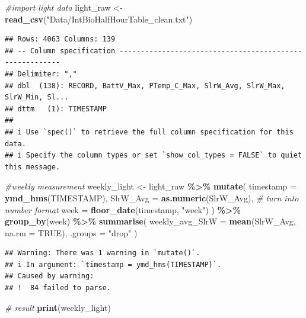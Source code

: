 \documentclass[
]{article}
\newenvironment{Shaded}{\begin{snugshade}}{\end{snugshade}}
\newcommand{\AttributeTok}[1]{\textcolor[rgb]{0.13,0.29,0.53}{#1}}
\newcommand{\CommentTok}[1]{\textcolor[rgb]{0.56,0.35,0.01}{\textit{#1}}}
\newcommand{\ConstantTok}[1]{\textcolor[rgb]{0.56,0.35,0.01}{#1}}
\newcommand{\FunctionTok}[1]{\textcolor[rgb]{0.13,0.29,0.53}{\textbf{#1}}}
\newcommand{\NormalTok}[1]{#1}
\newcommand{\OtherTok}[1]{\textcolor[rgb]{0.56,0.35,0.01}{#1}}
\newcommand{\SpecialCharTok}[1]{\textcolor[rgb]{0.81,0.36,0.00}{\textbf{#1}}}
\newcommand{\StringTok}[1]{\textcolor[rgb]{0.31,0.60,0.02}{#1}}
\begin{document}
\begin{Shaded}
\begin{Highlighting}[]
\CommentTok{\#import light data}
\NormalTok{light\_raw }\OtherTok{\textless{}{-}} \FunctionTok{read\_csv}\NormalTok{(}\StringTok{"Data/IntBioHalfHourTable\_clean.txt"}\NormalTok{)}
\end{Highlighting}
\end{Shaded}

\begin{verbatim}
## Rows: 4063 Columns: 139
## -- Column specification --------------------------------------------------------
## Delimiter: ","
## dbl  (138): RECORD, BattV_Max, PTemp_C_Max, SlrW_Avg, SlrW_Max, SlrW_Min, Sl...
## dttm   (1): TIMESTAMP
## 
## i Use `spec()` to retrieve the full column specification for this data.
## i Specify the column types or set `show_col_types = FALSE` to quiet this message.
\end{verbatim}

\begin{Shaded}
\begin{Highlighting}[]
\CommentTok{\#weekly measurement}
\NormalTok{weekly\_light }\OtherTok{\textless{}{-}}\NormalTok{ light\_raw }\SpecialCharTok{\%\textgreater{}\%}
  \FunctionTok{mutate}\NormalTok{(}
    \AttributeTok{timestamp =} \FunctionTok{ymd\_hms}\NormalTok{(TIMESTAMP),}
    \AttributeTok{SlrW\_Avg =} \FunctionTok{as.numeric}\NormalTok{(SlrW\_Avg),  }\CommentTok{\# turn into number format}
    \AttributeTok{week =} \FunctionTok{floor\_date}\NormalTok{(timestamp, }\StringTok{"week"}\NormalTok{)}
\NormalTok{  ) }\SpecialCharTok{\%\textgreater{}\%}
  \FunctionTok{group\_by}\NormalTok{(week) }\SpecialCharTok{\%\textgreater{}\%}
  \FunctionTok{summarise}\NormalTok{(}
    \AttributeTok{weekly\_avg\_SlrW =} \FunctionTok{mean}\NormalTok{(SlrW\_Avg, }\AttributeTok{na.rm =} \ConstantTok{TRUE}\NormalTok{),}
    \AttributeTok{.groups =} \StringTok{"drop"}
\NormalTok{  )}
\end{Highlighting}
\end{Shaded}

\begin{verbatim}
## Warning: There was 1 warning in `mutate()`.
## i In argument: `timestamp = ymd_hms(TIMESTAMP)`.
## Caused by warning:
## !  84 failed to parse.
\end{verbatim}

\begin{Shaded}
\begin{Highlighting}[]
\CommentTok{\# result}
\FunctionTok{print}\NormalTok{(weekly\_light)}
\end{Highlighting}
\end{Shaded}
\end{document}
